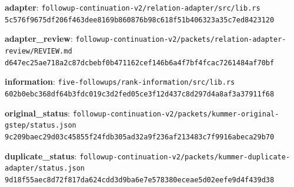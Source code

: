 \documentclass[10pt]{article}
\begin{document}
\textbf{adapter}: \nolinkurl{followup-continuation-v2/relation-adapter/src/lib.rs}\\{\scriptsize\texttt{5c576f9675df206f463dee8169b860876b98c618f51b406323a35c7ed8423120}}\par
\textbf{adapter\_review}: \nolinkurl{followup-continuation-v2/packets/relation-adapter-review/REVIEW.md}\\{\scriptsize\texttt{d647ec25ae718a2c87dcbebf0b471162cef146b6a4f7bf4fcac7261484af70bf}}\par
\textbf{information}: \nolinkurl{five-followups/rank-information/src/lib.rs}\\{\scriptsize\texttt{602b0ebc368df64b3fdc019c3d2fed05ce3f12d437c8d297d4a8af3a37911f68}}\par
\textbf{original\_status}: \nolinkurl{followup-continuation-v2/packets/kummer-original-gstep/status.json}\\{\scriptsize\texttt{9c209baec29d03c45855f24fdb305ad32a9f236af213483c7f9916abeca29b70}}\par
\textbf{duplicate\_status}: \nolinkurl{followup-continuation-v2/packets/kummer-duplicate-adapter/status.json}\\{\scriptsize\texttt{9d18f55aec8d72f817da624cdd3d9ba6e7e578380eceae5d02eefe9d4f439d38}}\par
\end{document}
